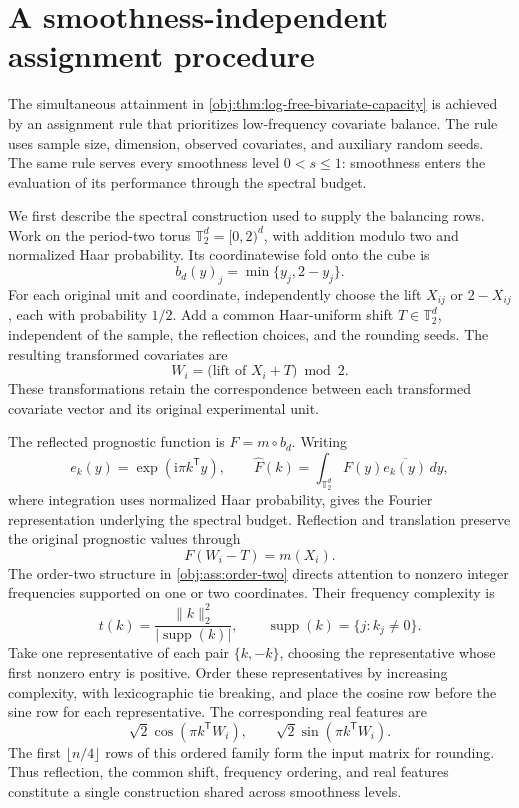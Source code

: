 \section{A smoothness-independent assignment procedure}

The simultaneous attainment in \cref{obj:thm:log-free-bivariate-capacity} is achieved by an assignment rule that prioritizes low-frequency covariate balance. The rule uses sample size, dimension, observed covariates, and auxiliary random seeds. The same rule serves every smoothness level \(0<s\leq1\): smoothness enters the evaluation of its performance through the spectral budget.

We first describe the spectral construction used to supply the balancing rows. Work on the period-two torus \(\mathbb T_2^d=[0,2)^d\), with addition modulo two and normalized Haar probability. Its coordinatewise fold onto the cube is
\[
b_d(y)_j=\min\{y_j,2-y_j\}.
\]
For each original unit and coordinate, independently choose the lift \(X_{ij}\) or \(2-X_{ij}\), each with probability \(1/2\). Add a common Haar-uniform shift \(T\in\mathbb T_2^d\), independent of the sample, the reflection choices, and the rounding seeds. The resulting transformed covariates are
\[
W_i=\bigl(\text{lift of }X_i+T\bigr)\bmod 2.
\]
These transformations retain the correspondence between each transformed covariate vector and its original experimental unit.

The reflected prognostic function is \(F=m\circ b_d\). Writing
\[
e_k(y)=\exp(\mathrm i\pi k^{\mathsf T}y),
\qquad
\widehat F(k)=\int_{\mathbb T_2^d}F(y)\overline{e_k(y)}\,dy,
\]
where integration uses normalized Haar probability, gives the Fourier representation underlying the spectral budget. Reflection and translation preserve the original prognostic values through
\[
F(W_i-T)=m(X_i).
\]
The order-two structure in \cref{obj:ass:order-two} directs attention to nonzero integer frequencies supported on one or two coordinates. Their frequency complexity is
\[
t(k)=\frac{\|k\|_2^2}{|\operatorname{supp}(k)|},
\qquad
\operatorname{supp}(k)=\{j:k_j\ne0\}.
\]
Take one representative of each pair \(\{k,-k\}\), choosing the representative whose first nonzero entry is positive. Order these representatives by increasing complexity, with lexicographic tie breaking, and place the cosine row before the sine row for each representative. The corresponding real features are
\[
\sqrt2\cos(\pi k^{\mathsf T}W_i),
\qquad
\sqrt2\sin(\pi k^{\mathsf T}W_i).
\]
The first \(\lfloor n/4\rfloor\) rows of this ordered family form the input matrix for rounding. Thus reflection, the common shift, frequency ordering, and real features constitute a single construction shared across smoothness levels.

